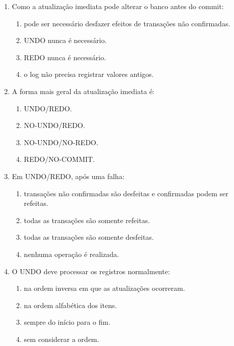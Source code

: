 \documentclass[12pt,a4paper]{article}
\begin{document}
\begin{enumerate}[label=\textbf{Q\arabic*.}]
\begin{enumerate}[label=\alph*)]
    \item atualizar o banco antes de chegar ao commit.
    \item atualizar o banco apenas depois do commit.
    \item executar somente leituras.
    \item dispensar completamente o log.
\end{enumerate}

\item Como a atualização imediata pode alterar o banco antes do commit:

\begin{enumerate}[label=\alph*)]
    \item pode ser necessário desfazer efeitos de transações não confirmadas.
    \item UNDO nunca é necessário.
    \item REDO nunca é necessário.
    \item o log não precisa registrar valores antigos.
\end{enumerate}

\item A forma mais geral da atualização imediata é:

\begin{enumerate}[label=\alph*)]
    \item UNDO/REDO.
    \item NO-UNDO/REDO.
    \item NO-UNDO/NO-REDO.
    \item REDO/NO-COMMIT.
\end{enumerate}

\item Em UNDO/REDO, após uma falha:

\begin{enumerate}[label=\alph*)]
    \item transações não confirmadas são desfeitas e confirmadas podem ser refeitas.
    \item todas as transações são somente refeitas.
    \item todas as transações são somente desfeitas.
    \item nenhuma operação é realizada.
\end{enumerate}

\item O UNDO deve processar os registros normalmente:

\begin{enumerate}[label=\alph*)]
    \item na ordem inversa em que as atualizações ocorreram.
    \item na ordem alfabética dos itens.
    \item sempre do início para o fim.
    \item sem considerar a ordem.
\end{enumerate}


\end{enumerate}
\end{document}
